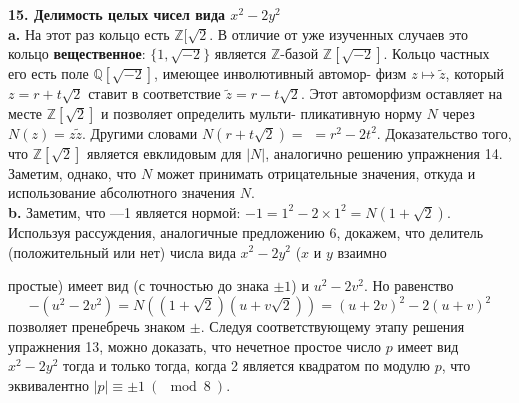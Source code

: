 \noindent\textbf{15. Делимость целых чисел вида $x^2-2y^2$} \newline 
\\
\hspace*{15pt}\textbf{a.} На этот раз кольцо есть $\mathbb{Z}[\sqrt{2}$. В отличие от уже изученных\linebreak 
слу­чаев это кольцо \textbf{вещественное}: $\{1,\sqrt{-2}\}$ является $\mathbb{Z}$-базой $\mathbb{Z}[\sqrt{-2}]$.\linebreak
Кольцо частных его есть поле $\mathbb{Q}[\sqrt{-2}]$, имеющее инволютивный автомор-\linebreak
физм $z\mapsto\widetilde{z}$, который $z=r+t\sqrt{2}$ ставит в соответствие $\widetilde{z}=r-t\sqrt{2}$. Этот\linebreak
автоморфизм оставляет на месте $\mathbb{Z}[\sqrt{2}]$ и позволяет определить мульти-\linebreak
пликативную норму $N$ через $N(z)=z\widetilde{z}$. Другими словами $N(r+t\sqrt{2})=$\linebreak
$=r^2-2t^2$. Доказательство того, что $\mathbb{Z}[\sqrt{2}]$ является евклидовым для $|N|$,\linebreak
аналогично решению упражнения 14. Заметим, однако, что $N$ может\linebreak
принимать отрицательные значения, откуда и использование абсолют­ного\linebreak
значения $N$.\newline
\\
\hspace*{15pt}\textbf{b.} Заметим, что —1 является нормой: $-1=1^2-2\times1^2=N(1+\sqrt{2})$.\linebreak
Используя рассуждения, аналогичные предложению 6, докажем, что \linebreak
делитель\: (положительный или нет) числа\: вида\: $x^2-2y^2$\: ($x$\: и\: $y$\:\hspace{3pt} взаимно

\pagebreak
%
%
\noindent простые) имеет вид (с точностью до знака $\pm1$) и $u^2-2v^2$. Но равенство\linebreak
$$-(u^2-2v^2)=N((1+\sqrt{2})(u+v\sqrt{2}))=(u+2v)^2-2(u+v)^2$$
позволяет пренебречь знаком $\pm$. Следуя соответствующему этапу \linebreak
ре­шения упражнения 13, можно доказать, что нечетное простое число\linebreak
$p$ имеет вид $x^2-2y^2$ тогда и только тогда, когда 2 является квадратом\linebreak
по модулю $p$, что эквивалентно $|p|\equiv\pm1~(\mod{8}~)$.\newline
\\

